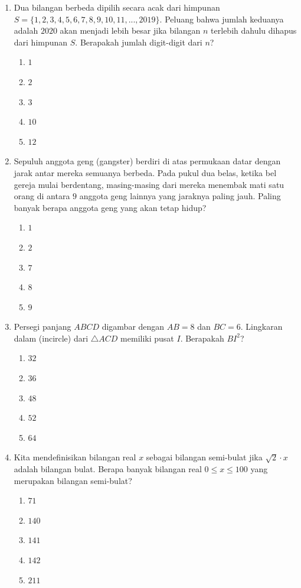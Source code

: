 \documentclass[12pt]{scrartcl}
\begin{document}
\begin{enumerate}
\item Dua bilangan berbeda dipilih secara acak dari himpunan $S=\{1,2,3,4,5,6,7,8,9,10,11,...,2019\}$. Peluang bahwa jumlah keduanya adalah $2020$ akan menjadi lebih besar jika bilangan $n$ terlebih dahulu dihapus dari himpunan $S$. Berapakah jumlah digit-digit dari $n$?
\begin{enumerate}
    \item $1$
    \item $2$
    \item $3$
    \item $10$
    \item $12$
\end{enumerate}

\item Sepuluh anggota geng (gangster) berdiri di atas permukaan datar dengan jarak antar mereka semuanya berbeda. Pada pukul dua belas, ketika bel gereja mulai berdentang, masing-masing dari mereka menembak mati satu orang di antara $9$ anggota geng lainnya yang jaraknya paling jauh. Paling banyak berapa anggota geng yang akan tetap hidup?
\begin{enumerate}
    \item $1$
    \item $2$
    \item $7$
    \item $8$
    \item $9$
\end{enumerate}

\item Persegi panjang $ABCD$ digambar dengan $AB=8$ dan $BC=6$. Lingkaran dalam (incircle) dari $\triangle ACD$ memiliki pusat $I$. Berapakah $BI^{2}$?
\begin{enumerate}
    \item $32$
    \item $36$
    \item $48$
    \item $52$
    \item $64$
\end{enumerate}

\item Kita mendefinisikan bilangan real $x$ sebagai bilangan semi-bulat jika $\sqrt{2}\cdot x$ adalah bilangan bulat. Berapa banyak bilangan real $0\le x\le100$ yang merupakan bilangan semi-bulat?
\begin{enumerate}
    \item $71$
    \item $140$
    \item $141$
    \item $142$
    \item $211$
\end{enumerate}


\end{enumerate}
\end{document}
